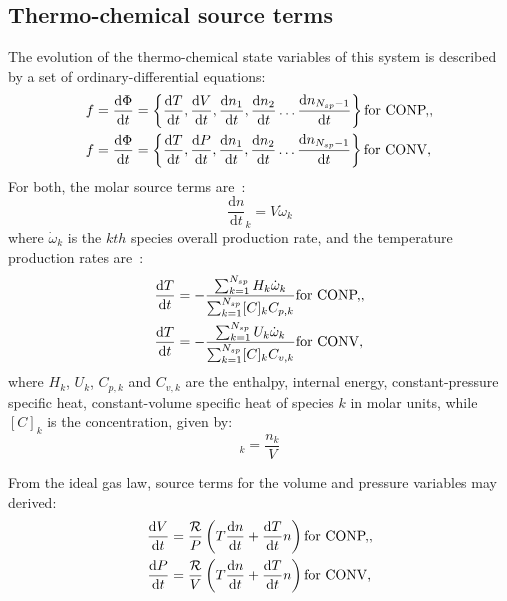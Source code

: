 \documentclass[12pt]{article}
\newcommand{\ns}{N_{sp}}
\newcommand{\conp}{CONP}
\newcommand{\conv}{CONV}
\newcommand{\dconp}{\ifmmode\text{for \conp,}\else for \conp,\fi}
\newcommand{\dconv}{\ifmmode\text{for \conv,}\else for \conv,\fi}
\newcommand{\Ru}{\mathcal{R}}
\begin{document}
\subsection{Thermo-chemical source terms}
The evolution of the thermo-chemical state variables of this system is described by a set of ordinary-differential equations:
\begin{subequations}
\label{e:source_terms}
\begin{align}
f &= \frac{\text{d} \Phi }{\text{d} t } = \left\{\frac{\text{d} T }{\text{d} t },\frac{\text{d} V }{\text{d} t },\frac{\text{d} n_1}{\text{d} t },\frac{\text{d} n_2 }{\text{d} t }\ldots \frac{\text{d} n_{\ns - 1} }{\text{d} t }\right\}\dconp, \\
f &= \frac{\text{d} \Phi }{\text{d} t } = \left\{\frac{\text{d} T }{\text{d} t },\frac{\text{d} P }{\text{d} t },\frac{\text{d} n_1}{\text{d} t },\frac{\text{d} n_2 }{\text{d} t }\ldots \frac{\text{d} n_{\ns - 1} }{\text{d} t }\right\}\dconv
\end{align}
\end{subequations}
For both, the molar source terms are~\cite{TurnsStephenR2012Aitc}:
\begin{equation}
\frac{\text{d} n }{\text{d} t }_{k} = V \dot{\omega}_{k} \label{e:spec}
\end{equation}
where $\dot{\omega}_k$ is the $kth$ species overall production rate, and the temperature production rates are~\cite{TurnsStephenR2012Aitc}:
\begin{subequations}
\label{e:temperature_incomplete}
\begin{align}
\frac{\text{d} T }{\text{d} t } &= - \frac{\sum_{k=1}^{\ns} H_{k} \dot{\omega}_{k}}{\sum_{k=1}^{\ns} [C]_{k} {C_{p, k}}}\dconp, \\
\frac{\text{d} T }{\text{d} t } &= - \frac{\sum_{k=1}^{\ns} U_{k} \dot{\omega}_{k}}{\sum_{k=1}^{\ns} [C]_{k} {C_{v, k}}}\dconv
\end{align}
\end{subequations}
where $H_k$, $U_k$, $C_{p,k}$ and $C_{v, k}$ are the enthalpy, internal energy, constant-pressure specific heat, constant-volume specific heat of species $k$ in molar units, while $[C]_{k}$ is the concentration, given by:
\begin{equation}
 [C]_{k} = \frac{n_{k}}{V}
\end{equation}


From the ideal gas law, source terms for the volume and pressure variables may derived:
\begin{subequations}
\label{e:param_incomplete}
\begin{align}
\frac{\text{d} V }{\text{d} t } &= \frac{\Ru}{P} \left(T \frac{\text{d} n }{\text{d} t } + \frac{\text{d} T }{\text{d} t } n\right)\dconp, \\
\frac{\text{d} P }{\text{d} t } &= \frac{\Ru}{V} \left(T \frac{\text{d} n }{\text{d} t } + \frac{\text{d} T }{\text{d} t } n\right)\dconv
\end{align}
\end{subequations}
\end{document}
